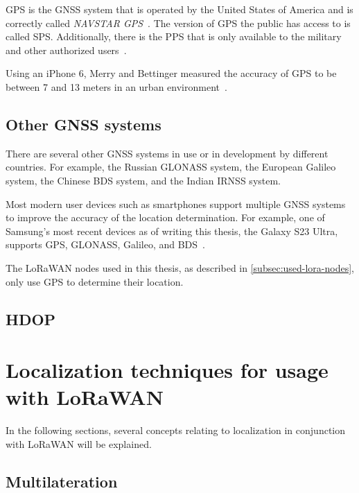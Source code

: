 \ac{GPS} is the \ac{GNSS} system that is operated by the United States of America and is correctly called \emph{NAVSTAR \ac{GPS}}~\cite{department_of_defense_usa_gps_2020}.
The version of GPS the public has access to is called \acf{SPS}.
Additionally, there is the \acf{PPS} that is only available to the military and other authorized users~\cite{department_of_defense_usa_gps_2007}.

Using an iPhone 6, Merry and Bettinger measured the accuracy of \ac{GPS} to be between 7 and 13 meters in an urban environment~\cite{merry_smartphone_2019}.

\subsection{Other \acs{GNSS} systems}

There are several other \ac{GNSS} systems in use or in development by different countries.
For example, the Russian \acf{GLONASS} system, the European \acf{Galileo} system, the Chinese \acf{BDS} system, and the Indian \acf{IRNSS} system.

Most modern user devices such as smartphones support multiple \ac{GNSS} systems to improve the accuracy of the location determination.
For example, one of Samsung's most recent devices as of writing this thesis, the Galaxy S23 Ultra, supports \ac{GPS}, \ac{GLONASS}, \ac{Galileo}, and \ac{BDS}~\cite{gsmarena_samsung_2023}.

The \ac{LoRaWAN} nodes used in this thesis, as described in \cref{subsec:used-lora-nodes}, only use \ac{GPS} to determine their location.

\subsection{\acf{HDOP}}


\section{Localization techniques for usage with \acs{LoRaWAN}}\label{sec:lorawan-localization-techniques}

In the following sections, several concepts relating to localization in conjunction with \ac{LoRaWAN} will be explained.

\subsection{Multilateration}\label{sec:lorawan-multilateration}

